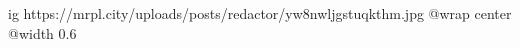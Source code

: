  
 
 
 
 

\ifcmt
  ig https://mrpl.city/uploads/posts/redactor/yw8nwljgstuqkthm.jpg
  @wrap center
  @width 0.6
\fi
